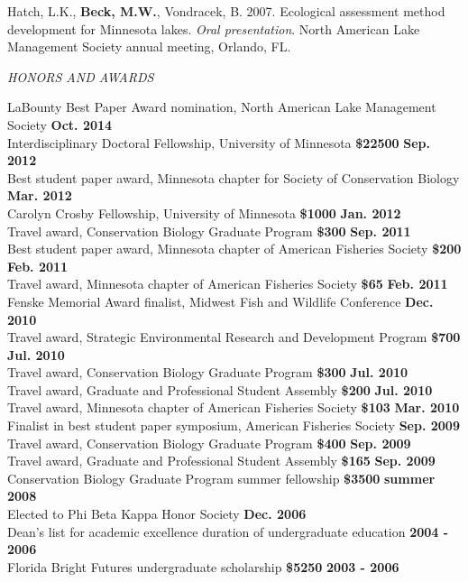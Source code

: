\documentclass[letterpaper,12pt]{article}
\newcommand{\sectitle}[1]{\vspace{\baselineskip} \centerline{\large{\textit{#1}}}}
\begin{document}
Hatch, L.K., {\bf Beck, M.W.}, Vondracek, B. 2007. Ecological assessment method development for Minnesota lakes. \textit{Oral presentation}. North American Lake Management Society annual meeting, Orlando, FL.

\sectitle{HONORS AND AWARDS}

LaBounty Best Paper Award nomination, North American Lake Management Society \hfill {\bf Oct. 2014} \\
Interdisciplinary Doctoral Fellowship, University of Minnesota {\bf \$22500} \hfill {\bf Sep. 2012} \\
Best student paper award, Minnesota chapter for Society of Conservation Biology \hfill {\bf Mar. 2012} \\
Carolyn Crosby Fellowship, University of Minnesota {\bf \$1000} \hfill {\bf Jan. 2012} \\
Travel award, Conservation Biology Graduate Program {\bf \$300} \hfill {\bf Sep. 2011} \\
Best student paper award, Minnesota chapter of American Fisheries Society {\bf \$200} \hfill {\bf Feb. 2011} \\
Travel award, Minnesota chapter of American Fisheries Society {\bf \$65} \hfill {\bf Feb. 2011} \\
Fenske Memorial Award finalist, Midwest Fish and Wildlife Conference \hfill {\bf Dec. 2010} \\
Travel award, Strategic Environmental Research and Development Program {\bf \$700} \hfill {\bf Jul. 2010} \\
Travel award, Conservation Biology Graduate Program {\bf \$300} \hfill {\bf Jul. 2010} \\
Travel award, Graduate and Professional Student Assembly {\bf \$200} \hfill {\bf Jul. 2010} \\
Travel award, Minnesota chapter of American Fisheries Society {\bf \$103} \hfill {\bf Mar. 2010} \\
Finalist in best student paper symposium, American Fisheries Society \hfill {\bf Sep. 2009} \\
Travel award, Conservation Biology Graduate Program {\bf \$400} \hfill {\bf Sep. 2009} \\
Travel award, Graduate and Professional Student Assembly {\bf \$165} \hfill {\bf Sep. 2009} \\
Conservation Biology Graduate Program summer fellowship {\bf \$3500} \hfill {\bf summer 2008} \\
Elected to Phi Beta Kappa Honor Society \hfill {\bf Dec. 2006} \\
Dean's list for academic excellence duration of undergraduate education \hfill {\bf 2004 - 2006} \\
Florida Bright Futures undergraduate scholarship {\bf \$5250} \hfill {\bf 2003 - 2006} 
\end{document}
